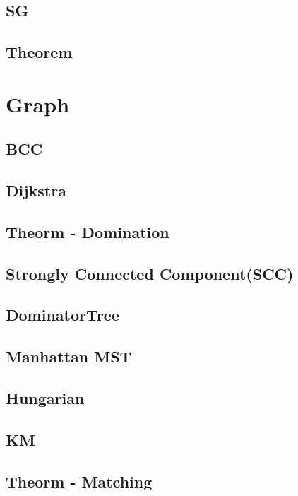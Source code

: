 \subsection{SG}

\subsection{Theorem}



\section{Graph}

\subsection{BCC}

\subsection{Dijkstra}

\subsection{Theorm - Domination}

\subsection{Strongly Connected Component(SCC)}
\subsection{DominatorTree}


\subsection{Manhattan MST}

\subsection{Hungarian}

\subsection{KM}

\subsection{Theorm - Matching}

